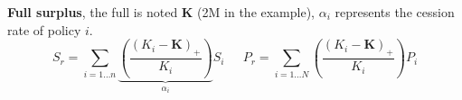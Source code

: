 \begin{f}
\textbf{Full surplus}, the full is noted $\boldsymbol{K}$ (2M\EUR{} in the example), $\alpha_i$ represents the cession rate of policy $i$.
	$$
	S_r= \sum_{i=1\ldots n}\underbrace{\left(\frac{\left(K_i-\boldsymbol{K} \right)_+ }{K_i} \right)}_{\alpha_i} S_i\quad \ \ P_r=\sum_{i=1\ldots N}\left(\frac{\left(K_i-\boldsymbol{K} \right)_+ }{K_i} \right)P_i 
	$$



\end{f}
